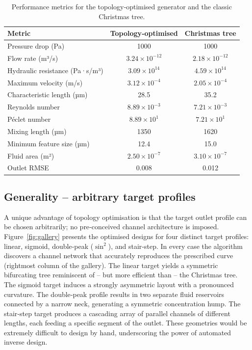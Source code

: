\documentclass[12pt]{article}
\begin{document}
\begin{table}[htbp]
\centering
\caption{Performance metrics for the topology‑optimised generator and the classic Christmas tree.}
\label{tab:comparison}
\begin{tabular}{lcc}
\toprule
Metric & Topology‑optimised & Christmas tree \\
\midrule
Pressure drop (Pa) & 1000 & 1000 \\
Flow rate (m³/s) & $3.24\times10^{-12}$ & $2.18\times10^{-12}$ \\
Hydraulic resistance (Pa·s/m³) & $3.09\times10^{14}$ & $4.59\times10^{14}$ \\
Maximum velocity (m/s) & $3.12\times10^{-4}$ & $2.05\times10^{-4}$ \\
Characteristic length (µm) & 28.5 & 35.2 \\
Reynolds number & $8.89\times10^{-3}$ & $7.21\times10^{-3}$ \\
Péclet number & $8.89\times10^{1}$ & $7.21\times10^{1}$ \\
Mixing length (µm) & 1350 & 1620 \\
Minimum feature size (µm) & 12.4 & 15.0 \\
Fluid area (m²) & $2.50\times10^{-7}$ & $3.10\times10^{-7}$ \\
Outlet RMSE & 0.008 & 0.012 \\
\bottomrule
\end{tabular}
\end{table}

\subsection{Generality -- arbitrary target profiles}
A unique advantage of topology optimisation is that the target outlet profile can be chosen arbitrarily; no pre‑conceived channel architecture is imposed. Figure~\ref{fig:gallery} presents the optimised designs for four distinct target profiles: linear, sigmoid, double‑peak ($\sin^2$), and stair‑step. In every case the algorithm discovers a channel network that accurately reproduces the prescribed curve (rightmost column of the gallery). The linear target yields a symmetric bifurcating tree reminiscent of – but more efficient than – the Christmas tree. The sigmoid target induces a strongly asymmetric layout with a pronounced curvature. The double‑peak profile results in two separate fluid reservoirs connected by a narrow neck, generating a symmetric concentration hump. The stair‑step target produces a cascading array of parallel channels of different lengths, each feeding a specific segment of the outlet. These geometries would be extremely difficult to design by hand, underscoring the power of automated inverse design.
\end{document}

